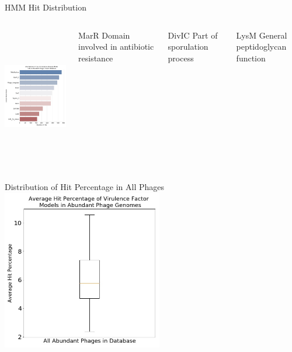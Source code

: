 \documentclass[11pt]{beamer}
\begin{document}
	
	\begin{frame}{HMM Hit Distribution}
	\begin{columns}
	\includegraphics[height=6cm, width=6cm]{Abundant_Phages_HMM_ID.jpg}
	\begin{block}{MarR}
	Domain involved in antibiotic resistance
	\end{block}
	\begin{block}{DivIC}
	Part of sporulation process
	\end{block}
	\begin{block}{LysM}
	General peptidoglycan function
	\end{block}
	\end{columns}
	\end{frame}
	
	\begin{frame}{Distribution of Hit Percentage in All Phages}
	\centering
	\includegraphics[height=7cm, width=7cm]{Abundant_Phages_Percentage.jpg}
	
	\end{frame}
	
\end{document}
